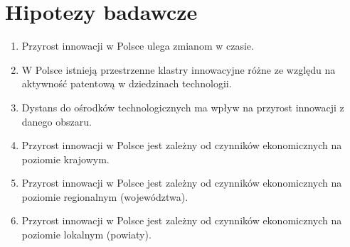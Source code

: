 \section{Hipotezy badawcze}

  \begin{enumerate}

\item
Przyrost innowacji w Polsce ulega zmianom w czasie.



\item
W Polsce istnieją przestrzenne klastry innowacyjne różne ze 
względu na aktywność patentową w dziedzinach technologii.



\item
Dystans do ośrodków technologicznych ma wpływ na przyrost innowacji 
z danego obszaru.



\item
Przyrost innowacji w Polsce jest zależny od czynników ekonomicznych 
na poziomie krajowym.



\item
Przyrost innowacji w Polsce jest zależny od czynników ekonomicznych 
na poziomie regionalnym (województwa).



\item
Przyrost innowacji w Polsce jest zależny od czynników ekonomicznych 
na poziomie lokalnym (powiaty).

\end{enumerate}